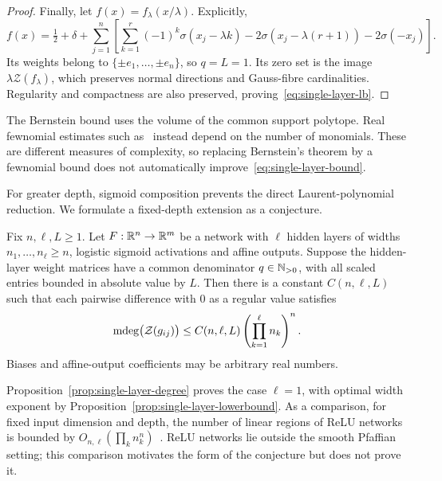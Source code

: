 \begin{proof}
Finally, let $f(x)=f_\lambda(x/\lambda)$. Explicitly,
\[
f(x)=\tfrac12+\delta+\sum_{j=1}^n
\left[\sum_{k=1}^r(-1)^k\sigma(x_j-\lambda k)
-2\sigma(x_j-\lambda(r+1))-2\sigma(-x_j)\right].
\]
Its weights belong to $\{\pm e_1,\dots,\pm e_n\}$, so $q=L=1$. Its zero set is the image $\lambda\mathcal Z(f_\lambda)$, which preserves normal directions and Gauss-fibre cardinalities. Regularity and compactness are also preserved, proving~\eqref{eq:single-layer-lb}.
\end{proof}

\begin{remark}\label{rem:why-not-fewnomials}
The Bernstein bound uses the volume of the common support polytope. Real fewnomial estimates such as~\cite{bihansottile2007} instead depend on the number of monomials. These are different measures of complexity, so replacing Bernstein's theorem by a fewnomial bound does not automatically improve~\eqref{eq:single-layer-bound}.
\end{remark}

For greater depth, sigmoid composition prevents the direct Laurent-polynomial reduction. We formulate a fixed-depth extension as a conjecture.

\begin{conjecture}\label{conj:multi-layer-degree}
Fix $n,\ell,L\ge1$. Let $F:\mathbb{R}^n\to\mathbb{R}^m$ be a network with $\ell$ hidden layers of widths $n_1,\dots,n_\ell\ge n$, logistic sigmoid activations and affine outputs. Suppose the hidden-layer weight matrices have a common denominator $q\in\mathbb{N}_{>0}$, with all scaled entries bounded in absolute value by $L$. Then there is a constant $C(n,\ell,L)$ such that each pairwise difference with $0$ as a regular value satisfies
\begin{equation}\label{eq:multi-layer-bound}
\operatorname{\mathrm{mdeg}}\bigl(\mathcal Z(g_{ij})\bigr)
\le C(n,\ell,L)\left(\prod_{k=1}^\ell n_k\right)^n.
\end{equation}
Biases and affine-output coefficients may be arbitrary real numbers.
\end{conjecture}

Proposition~\ref{prop:single-layer-degree} proves the case $\ell=1$, with optimal width exponent by Proposition~\ref{prop:single-layer-lowerbound}. As a comparison, for fixed input dimension and depth, the number of linear regions of ReLU networks is bounded by $O_{n,\ell}(\prod_k n_k^n)$~\cite{raghu2017,serra2018,hanin2019}. ReLU networks lie outside the smooth Pfaffian setting; this comparison motivates the form of the conjecture but does not prove it.

